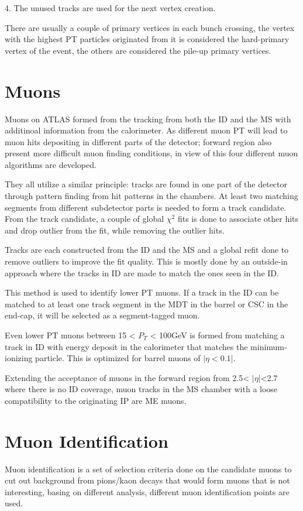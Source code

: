 4. The unused tracks are used for the next vertex creation. 

There are usually a couple of primary vertices in each bunch crossing, the vertex with the highest PT particles originated from it is considered the hard-primary vertex of the event, the others are considered the pile-up primary vertices. 


\section{Muons}
Muons on ATLAS formed from the tracking from both the ID and the MS with additinoal information from the calorimeter. 
As different muon PT will lead to muon hits depositing in different parts of the detector; forward region also present more difficult muon finding conditions, in view of this four different muon algorithms are developed. 

They all utilize a similar principle: tracks are found in one part of the detector through pattern finding from hit patterns in the chambers. At least two matching segments from different subdetector parts is needed to form a track candidate. From the track candidate, a couple of global $\chi^{2}$ fits is done to associate other hits and drop outlier from the fit, while removing the outlier hits. 

Tracks are each constructed from the ID and the MS and a global refit done to remove outliers to improve the fit quality. This is mostly done by an outside-in approach where the tracks in ID are made to match the ones seen in the ID. 

This method is used to identify lower PT muons. If a track in the ID can be matched to at least one track segment in the MDT in the barrel or CSC in the end-cap, it will be selected as a segment-tagged muon. 

Even lower PT muons between 15 < $P_{T}$ < 100GeV is formed from matching a track in ID with energy deposit in the calorimeter that matches the minimum-ionizing particle. This is optimized for barrel muons of $|\eta <0.1|$. 

Extending the acceptance of muons in the forward region from 2.5< $|\eta|$<2.7 where there is no ID coverage, muon tracks in the MS chamber with a loose compatibility to the originating IP are ME muons. 

\section{Muon Identification}
Muon identification is a set of selection criteria done on the candidate muons to cut out background from pions/kaon decays that would form muons that is not interesting, basing on different analysis, different muon identification points are used. 

